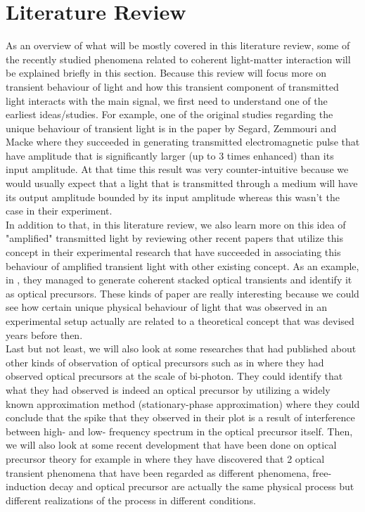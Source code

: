 \chapter{Literature Review}
As an overview of what will be mostly covered in this literature review, some of the recently studied phenomena related to coherent light-matter interaction will be explained briefly in this section. Because this review will focus more on transient behaviour of light and how this transient component of transmitted light interacts with the main signal, we first need to understand one of the earliest ideas/studies. For example, one of the original studies regarding the unique behaviour of transient light is in the paper by Segard, Zemmouri and Macke \cite{Segard_1987} where they succeeded in generating transmitted electromagnetic pulse that have amplitude that is significantly larger (up to 3 times enhanced) than its input amplitude. At that time this result was very counter-intuitive because we would usually expect that a light that is transmitted through a medium will have its output amplitude bounded by its input amplitude whereas this wasn't the case in their experiment.\\

In addition to that, in this literature review, we also learn more on this idea of "amplified" transmitted light by reviewing other recent papers that utilize this concept in their experimental research that have succeeded in associating this behaviour of amplified transient light with other existing concept. As an example, in \cite{jeong2010slow}, they managed to generate coherent stacked optical transients and identify it as optical precursors. These kinds of paper are really interesting because we could see how certain unique physical behaviour of light that was observed in an experimental setup actually are related to a theoretical concept that was devised years before then.\\

Last but not least, we will also look at some researches that had published about other kinds of observation of optical precursors such as in \cite{Du2008} where they had observed optical precursors at the scale of bi-photon. They could identify that what they had observed is indeed an optical precursor by utilizing a widely known approximation method (stationary-phase approximation) where they could conclude that the spike that they observed in their plot is a result of interference between high- and low- frequency spectrum in the optical precursor itself. Then, we will also look at some recent development that have been done on optical precursor theory for example in \cite{Chen2010} where they have discovered that 2 optical transient phenomena that have been regarded as different phenomena, free-induction decay and optical precursor are actually the same physical process  but different realizations of the process in different conditions.\\

